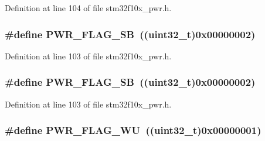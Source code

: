 Definition at line 104 of file stm32f10x\+\_\+pwr.\+h.

\subsubsection[{\texorpdfstring{P\+W\+R\+\_\+\+F\+L\+A\+G\+\_\+\+SB}{PWR_FLAG_SB}}]{\setlength{\rightskip}{0pt plus 5cm}\#define P\+W\+R\+\_\+\+F\+L\+A\+G\+\_\+\+SB~(({\bf uint32\+\_\+t})0x00000002)}\hypertarget{group___p_w_r___flag_ga9e55f0b5dec2346d5c8dee3ab3c0c2df}{}\label{group___p_w_r___flag_ga9e55f0b5dec2346d5c8dee3ab3c0c2df}


Definition at line 103 of file stm32f10x\+\_\+pwr.\+h.

\subsubsection[{\texorpdfstring{P\+W\+R\+\_\+\+F\+L\+A\+G\+\_\+\+SB}{PWR_FLAG_SB}}]{\setlength{\rightskip}{0pt plus 5cm}\#define P\+W\+R\+\_\+\+F\+L\+A\+G\+\_\+\+SB~(({\bf uint32\+\_\+t})0x00000002)}\hypertarget{group___p_w_r___flag_ga9e55f0b5dec2346d5c8dee3ab3c0c2df}{}\label{group___p_w_r___flag_ga9e55f0b5dec2346d5c8dee3ab3c0c2df}


Definition at line 103 of file stm32f10x\+\_\+pwr.\+h.

\subsubsection[{\texorpdfstring{P\+W\+R\+\_\+\+F\+L\+A\+G\+\_\+\+WU}{PWR_FLAG_WU}}]{\setlength{\rightskip}{0pt plus 5cm}\#define P\+W\+R\+\_\+\+F\+L\+A\+G\+\_\+\+WU~(({\bf uint32\+\_\+t})0x00000001)}\hypertarget{group___p_w_r___flag_ga2d06760a5769e729b06d41e37036d58e}{}\label{group___p_w_r___flag_ga2d06760a5769e729b06d41e37036d58e}


